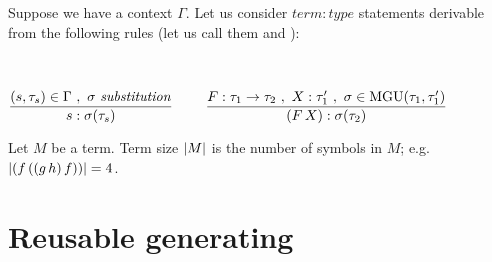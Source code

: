 \documentclass[a4paper,oneside]{memoir}
\begin{document}
Suppose we have a context $\Gamma$. Let us consider $\mathit{term:type}$ statements derivable from the following rules (let us call them \subAx and \mguMp):

~

$\dfrac{(s,\tau_s) \in \Gamma\ ,\ \sigma\ \mathit{substitution}}{s : \sigma(\tau_s)}$
~~~
$\dfrac{F : \tau_1 \rightarrow \tau_2\ ,\ X : \tau^\prime_1\ , \ \sigma \in \operatorname{MGU}(\tau_1,\tau^\prime_1)}{(F\,X) : \sigma(\tau_2)}$


\begin{definition}
Let $M$ be a term. Term size $\lvert M \rvert$ is the number of symbols in $M$; e.g. $\lvert (f\,((g\,h)\,f)) \rvert = 4$. 
\end{definition}

\newcommand{\inhab}[1]{\op{I}(#1)}

\newcommand{\tord}{\preccurlyeq}
\newcommand{\stord}{\prec}
\newcommand{\ordt}{\tord_\tau}
\newcommand{\tek}{\sim}
\newcommand{\ntek}{\nsim}
\newcommand{\ekt}{\tek_\tau}
\newcommand{\nekt}{\ntek_\tau}
\newcommand{\nsucct}{\nsucc_\tau}

\newcommand{\MGI}[1]{\op{MGI}(#1)}
\newcommand{\MGIt}{\MGI{\tau}}
\newcommand{\It}{\op{I}(\tau)}

\newcommand{\ids}{\sigma_{\op{id}}}

\newcommand{\U}[2]{\op{U}(#1,#2)}
\newcommand{\Utt}{\U{\tau}{\tauPr}}
\newcommand{\MGUtt}{\MGU{\tau}{\tauPr}}

\newcommand{\e}[2]{\op{E}_{#1}(#2)}
\newcommand{\restrict}[2]{{#1}_{\mid #2}}
\newcommand{\fresh}[2]{\op{fresh}_{#1}(#2)}
\newcommand{\newVar}[1]{\op{newVar}(#1)}
\newcommand{\Ss}[1]{\op{ss}(#1)}
\newcommand{\TS}[2]{\op{ts}_{#1}(#2)}
\newcommand{\ts}[2]{\op{ts}_{#1}(#2)}
\newcommand{\TSij}[3]{\op{ts}_{#1,#2}(#3)}
\newcommand{\trees}[2]{\op{trees}_{#1}(#2)}
\newcommand{\FX}{\ap{F}{X}}
\newcommand{\sF}{\s_{F}}
\newcommand{\sX}{\s_{X}}
\newcommand{\vars}[1]{\op{vars}(#1)}
\newcommand{\dom}[1]{\op{dom}(#1)}
\newcommand{\IH}{induction hypothesis\xspace}
\newcommand{\discup}{~\mathbin{\dot{\cup}}~}



\section{Reusable generating}
\end{document}
